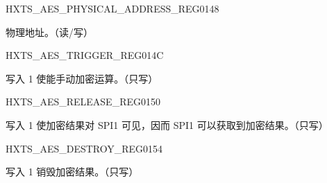 \begin{register}{H}{XTS\_AES\_PHYSICAL\_ADDRESS\_REG}{\hexprefix{}0148}\label{regdesc:XTSAESPHYSICALADDRESSREG}
%
%
\regnewline%
\begin{regdesc}\begin{reglist}
\item [XTS\_AES\_PHYSICAL\_ADDRESS] 物理地址。（读/写）
\end{reglist}\end{regdesc}
\end{register}

\begin{register}{H}{XTS\_AES\_TRIGGER\_REG}{\hexprefix{}014C}\label{regdesc:XTSAESTRIGGERREG}
%
%
\regnewline%
\begin{regdesc}\begin{reglist}
\item [XTS\_AES\_TRIGGER] 写入 1 使能手动加密运算。（只写）
\end{reglist}\end{regdesc}
\end{register}

\begin{register}{H}{XTS\_AES\_RELEASE\_REG}{\hexprefix{}0150}\label{regdesc:XTSAESRELEASEREG}
%
%
\regnewline%
\begin{regdesc}\begin{reglist}
\item [XTS\_AES\_RELEASE] 写入 1 使加密结果对 SPI1 可见，因而 SPI1 可以获取到加密结果。（只写）
\end{reglist}\end{regdesc}
\end{register}

\begin{register}{H}{XTS\_AES\_DESTROY\_REG}{\hexprefix{}0154}\label{regdesc:XTSAESDESTROYREG}
%
%
\regnewline%
\begin{regdesc}\begin{reglist}
\item [XTS\_AES\_DESTROY] 写入 1 销毁加密结果。（只写）
\end{reglist}\end{regdesc}
\end{register}


